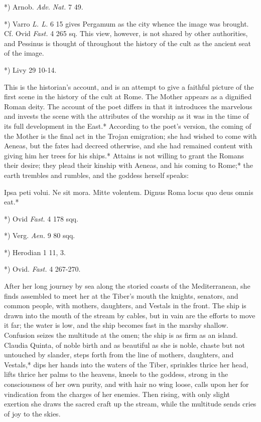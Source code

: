 \documentclass[a4paper, 11pt, oneside, polutonikogreek, english]{article}
\begin{document}
*) Arnob. \emph{Adv. Nat.} 7 49.

*) Varro \emph{L. L.} 6 15 gives Pergamum as the city whence the image was brought. Cf. Ovid \emph{Fast.} 4 265 sq. This view, however, is not shared by other authorities, and Pessinus is thought of throughout the history of the cult as the ancient seat of the image.

*) Livy 29 10-14.

This is the historian's account, and is an attempt to give a faithful picture of the first scene in the history of the cult at Rome. The Mother appears as a dignified Roman deity. The account of the poet differs in that it introduces the marvelous and invests the scene with the attributes of the worship as it was in the time of its full development in the East.* According to the poet's version, the coming of the Mother is the final act in the Trojan emigration; she had wished to come with Aeneas, but the fates had decreed otherwise, and she had remained content with giving him her trees for his ships.* Attains is not willing to grant the Romans their desire; they plead their kinship with Aeneas, and his coming to Rome;* the earth trembles and rumbles, and the goddess herself speaks:

Ipsa peti volui. Ne sit mora. Mitte volentem.  
Dignus Roma locus quo deus omnis eat.*  

*) Ovid \emph{Fast.} 4 178 sqq.

*) Verg. \emph{Aen.} 9 80 sqq.

*) Herodian 1 11, 3.

*) Ovid. \emph{Fast.} 4 267-270.

After her long journey by sea along the storied coasts of the Mediterranean, she finds assembled to meet her at the Tiber's mouth the knights, senators, and common people, with mothers, daughters, and Vestals in the front. The ship is drawn into the mouth of the stream by cables, but in vain are the efforts to move it far; the water is low, and the ship becomes fast in the marshy shallow. Confusion seizes the multitude at the omen; the ship is as firm as an island. Claudia Quinta, of noble birth and as beautiful as she is noble, chaste but not untouched by slander, steps forth from the line of mothers, daughters, and Vestals,* dips her hands into the waters of the Tiber, sprinkles thrice her head, lifts thrice her palms to the heavens, kneels to the goddess, strong in the consciousness of her own purity, and with hair no wing loose, calls upon her for vindication from the charges of her enemies. Then rising, with only slight exertion she draws the sacred craft up the stream, while the multitude sends cries of joy to the skies.
\end{document}
